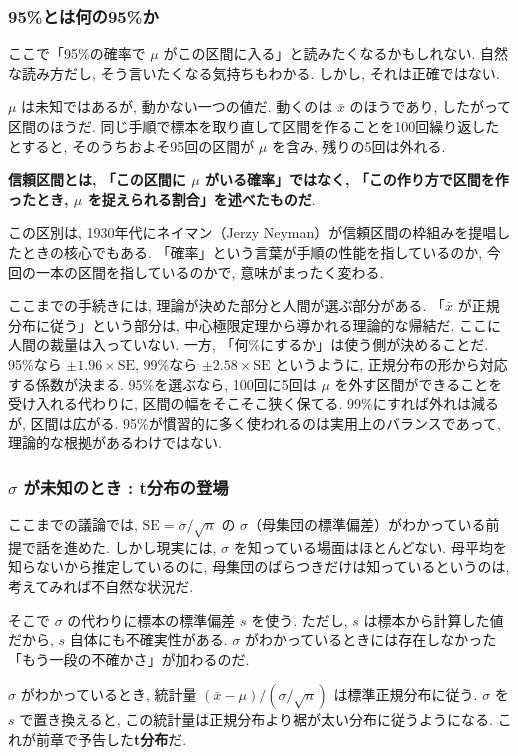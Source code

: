 \subsubsection{95\%とは何の95\%か}

ここで「95\%の確率で $\mu$ がこの区間に入る」と読みたくなるかもしれない.
自然な読み方だし, そう言いたくなる気持ちもわかる.
しかし, それは正確ではない.

$\mu$ は未知ではあるが, 動かない一つの値だ.
動くのは $\bar{x}$ のほうであり, したがって区間のほうだ.
同じ手順で標本を取り直して区間を作ることを100回繰り返したとすると, そのうちおよそ95回の区間が $\mu$ を含み, 残りの5回は外れる.

\textbf{信頼区間とは, 「この区間に $\mu$ がいる確率」ではなく, 「この作り方で区間を作ったとき, $\mu$ を捉えられる割合」を述べたものだ}.

この区別は, 1930年代にネイマン（Jerzy Neyman）が信頼区間の枠組みを提唱したときの核心でもある.
「確率」という言葉が手順の性能を指しているのか, 今回の一本の区間を指しているのかで, 意味がまったく変わる.

ここまでの手続きには, 理論が決めた部分と人間が選ぶ部分がある.
「$\bar{x}$ が正規分布に従う」という部分は, 中心極限定理から導かれる理論的な帰結だ.
ここに人間の裁量は入っていない.
一方, 「何\%にするか」は使う側が決めることだ.
95\%なら $\pm 1.96 \times \mathrm{SE}$, 99\%なら $\pm 2.58 \times \mathrm{SE}$ というように, 正規分布の形から対応する係数が決まる.
95\%を選ぶなら, 100回に5回は $\mu$ を外す区間ができることを受け入れる代わりに, 区間の幅をそこそこ狭く保てる.
99\%にすれば外れは減るが, 区間は広がる.
95\%が慣習的に多く使われるのは実用上のバランスであって, 理論的な根拠があるわけではない.

\subsubsection{$\sigma$ が未知のとき : t分布の登場}

ここまでの議論では, $\mathrm{SE} = \sigma / \sqrt{n}$ の $\sigma$（母集団の標準偏差）がわかっている前提で話を進めた.
しかし現実には, $\sigma$ を知っている場面はほとんどない.
母平均を知らないから推定しているのに, 母集団のばらつきだけは知っているというのは, 考えてみれば不自然な状況だ.

そこで $\sigma$ の代わりに標本の標準偏差 $s$ を使う.
ただし, $s$ は標本から計算した値だから, $s$ 自体にも不確実性がある.
$\sigma$ がわかっているときには存在しなかった「もう一段の不確かさ」が加わるのだ.

$\sigma$ がわかっているとき, 統計量 $(\bar{x} - \mu) / (\sigma / \sqrt{n})$ は標準正規分布に従う.
$\sigma$ を $s$ で置き換えると, この統計量は正規分布より裾が太い分布に従うようになる.
これが前章で予告した\textbf{t分布}だ.

